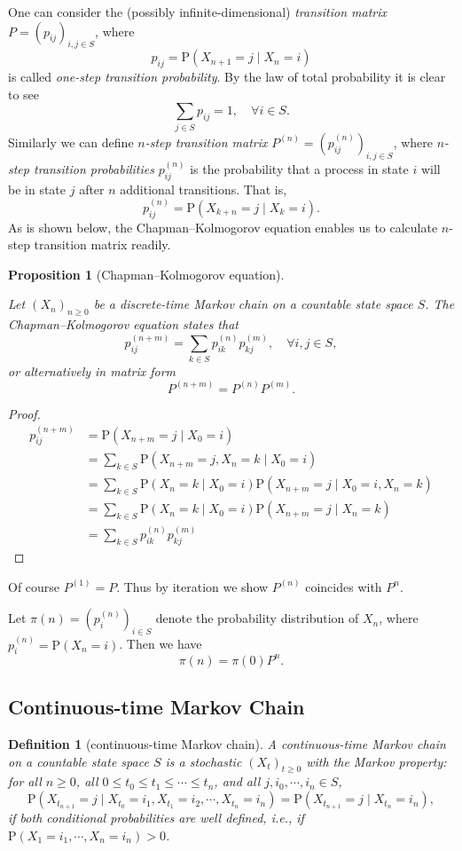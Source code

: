 \documentclass{article}
\newtheorem{definition}{Definition}[section]
\newtheorem{proposition}{Proposition}[section]
\theoremstyle{nonumberplain}
\newtheorem{proof}{Proof.}
\begin{document}
\noindent One can consider the (possibly infinite-dimensional) \emph{transition matrix}	$P=(p_{ij})_{i,j\in S}$, where
\[
p_{ij}=\mathrm{P}(X_{n+1}=j\mid X_{n}=i)
\]
is called \emph{one-step transition probability}. By the law of total probability it is clear to see 
\[
\sum_{j\in S}p_{ij}=1,\quad\forall i\in S.
\]
Similarly we can define \emph{$n$-step transition matrix} $P^{(n)}=\left(p^{(n)}_{ij}\right)_{i,j\in S}$, where \emph{$n$-step transition probabilities} $p^{(n)}_{ij}$ is the probability that a process in state $i$ will be in state $j$ after $n$ additional transitions. That is,
\[
p^{(n)}_{ij}=\mathrm{P}(X_{k+n}=j\mid X_{k}=i).
\]
As is shown below, the Chapman–Kolmogorov equation enables us to calculate $n$-step transition matrix readily.
\begin{proposition}[Chapman–Kolmogorov equation]\hypertarget{Proposition 4.1}{}
Let $(X_n)_{n\ge0}$ be a discrete-time Markov chain on a countable state space $S$. The \emph{Chapman–Kolmogorov equation} states that
\[
p^{(n+m)}_{ij}=\sum_{k\in S}p^{(n)}_{ik}p^{(m)}_{kj},\quad\forall i,j\in S,
\]
or alternatively in matrix form
\[
P^{(n+m)}=P^{(n)}P^{(m)}.
\]
\end{proposition}
\begin{proof}
	\[
	\begin{aligned}
		p^{(n+m)}_{ij}&=\mathrm{P}(X_{n+m}=j\mid X_{0}=i)\\
		&=\sum_{k\in S}\mathrm{P}(X_{n+m}=j,X_{n}=k\mid X_{0}=i)\\
		&=\sum_{k\in S}\mathrm{P}(X_{n}=k\mid X_{0}=i)\mathrm{P}(X_{n+m}=j\mid X_{0}=i,X_{n}=k)\\
		&=\sum_{k\in S}\mathrm{P}(X_{n}=k\mid X_{0}=i)\mathrm{P}(X_{n+m}=j\mid X_{n}=k)\\
		&=\sum_{k\in S}p^{(n)}_{ik}p^{(m)}_{kj}
	\end{aligned}
	\]
\end{proof}
\noindent Of course $P^{(1)}=P$. Thus by iteration we show $P^{(n)}$ coincides with $P^n$. 

\noindent Let $\pi(n)=\left(p_i^{(n)}\right)_{i\in S}$ denote the probability distribution of $X_n$, where $p_i^{(n)}=\mathrm{P}(X_n=i)$. Then we have
\[
\pi(n)=\pi(0)P^n.
\]

\subsection{Continuous-time Markov Chain}

\begin{definition}[continuous-time Markov chain]
	A \emph{continuous-time Markov chain} on a countable state space $S$ is a stochastic $(X_t)_{t\ge 0}$ with the Markov property: for all $ n\ge0$, all $0\le t_0\le t_1\le \cdots\le t_n$, and all	$j,i_0,\cdots,i_n\in S$,
	\[
	\mathrm{P}(X_{t_{n+1}}=j\mid X_{t_0}=i_{1},X_{t_1}=i_{2},\cdots,X_{t_n}=i_{n})=\mathrm{P}(X_{t_{n+1}}=j\mid X_{t_n}=i_{n}), 
	\] if both conditional probabilities are well defined, i.e., if $ 	\mathrm{P}(X_{1}=i_{1},\cdots ,X_{n}=i_{n})>0$.
\end{definition}
\end{document}
